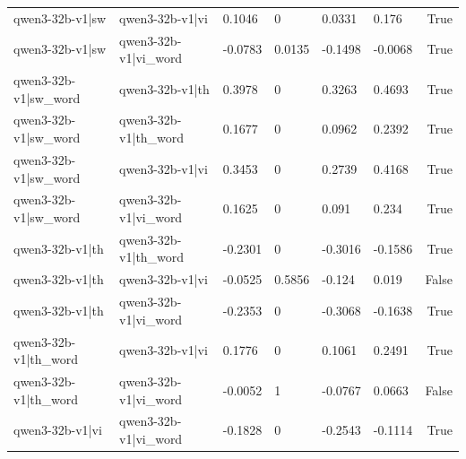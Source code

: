 \begin{table}
\begin{tabular}{llllllr}
qwen3-32b-v1|sw & qwen3-32b-v1|vi & 0.1046 & 0 & 0.0331 & 0.176 & True \\
qwen3-32b-v1|sw & qwen3-32b-v1|vi_word & -0.0783 & 0.0135 & -0.1498 & -0.0068 & True \\
qwen3-32b-v1|sw_word & qwen3-32b-v1|th & 0.3978 & 0 & 0.3263 & 0.4693 & True \\
qwen3-32b-v1|sw_word & qwen3-32b-v1|th_word & 0.1677 & 0 & 0.0962 & 0.2392 & True \\
qwen3-32b-v1|sw_word & qwen3-32b-v1|vi & 0.3453 & 0 & 0.2739 & 0.4168 & True \\
qwen3-32b-v1|sw_word & qwen3-32b-v1|vi_word & 0.1625 & 0 & 0.091 & 0.234 & True \\
qwen3-32b-v1|th & qwen3-32b-v1|th_word & -0.2301 & 0 & -0.3016 & -0.1586 & True \\
qwen3-32b-v1|th & qwen3-32b-v1|vi & -0.0525 & 0.5856 & -0.124 & 0.019 & False \\
qwen3-32b-v1|th & qwen3-32b-v1|vi_word & -0.2353 & 0 & -0.3068 & -0.1638 & True \\
qwen3-32b-v1|th_word & qwen3-32b-v1|vi & 0.1776 & 0 & 0.1061 & 0.2491 & True \\
qwen3-32b-v1|th_word & qwen3-32b-v1|vi_word & -0.0052 & 1 & -0.0767 & 0.0663 & False \\
qwen3-32b-v1|vi & qwen3-32b-v1|vi_word & -0.1828 & 0 & -0.2543 & -0.1114 & True \\
\bottomrule
\end{tabular}
\end{table}

